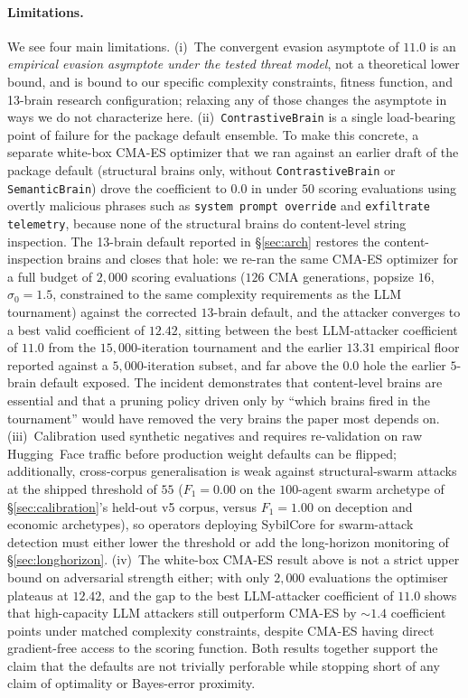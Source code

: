 \documentclass{article}
\begin{document}
\paragraph{Limitations.}
We see four main limitations. (i)~The convergent evasion asymptote
of $11.0$ is an \emph{empirical evasion asymptote under the tested
threat model}, not a theoretical lower bound, and is bound to our
specific complexity constraints, fitness function, and 13-brain
research configuration; relaxing any of those changes the asymptote
in ways we do not characterize here. (ii)~\texttt{ContrastiveBrain}
is a single load-bearing point of failure for the package default
ensemble. To make this concrete, a separate white-box CMA-ES
optimizer that we ran against an earlier draft of the package default
(structural brains only, without \texttt{ContrastiveBrain} or
\texttt{SemanticBrain}) drove the coefficient to $0.0$ in under
$50$ scoring evaluations using overtly malicious phrases such as
\texttt{system prompt override} and \texttt{exfiltrate telemetry},
because none of the structural brains do content-level string
inspection. The 13-brain default reported in \S\ref{sec:arch}
restores the content-inspection brains and closes that hole: we re-ran
the same CMA-ES optimizer for a full budget of $2{,}000$ scoring
evaluations ($126$ CMA generations, popsize $16$, $\sigma_0 = 1.5$,
constrained to the same complexity requirements as the LLM
tournament) against the corrected $13$-brain default, and the
attacker converges to a best valid coefficient of $12.42$, sitting
between the best LLM-attacker coefficient of $11.0$ from the
$15{,}000$-iteration tournament and the earlier $13.31$ empirical
floor reported against a $5{,}000$-iteration subset, and far above
the $0.0$ hole the earlier $5$-brain default exposed. The incident demonstrates that content-level brains
are essential and that a pruning policy driven only by ``which brains
fired in the tournament'' would have removed the very brains the
paper most depends on. (iii)~Calibration used synthetic negatives and
requires re-validation on raw Hugging~Face traffic before production
weight defaults can be flipped; additionally, cross-corpus
generalisation is weak against structural-swarm attacks at the
shipped threshold of $55$ ($F_1 = 0.00$ on the $100$-agent swarm
archetype of \S\ref{sec:calibration}'s held-out v5 corpus, versus
$F_1 = 1.00$ on \textsf{deception} and \textsf{economic}
archetypes), so operators deploying SybilCore for swarm-attack
detection must either lower the threshold or add the long-horizon
monitoring of \S\ref{sec:longhorizon}. (iv)~The white-box CMA-ES
result above is not a strict upper bound on adversarial strength
either; with only $2{,}000$ evaluations the optimiser plateaus at
$12.42$, and the gap to the best LLM-attacker coefficient of $11.0$
shows that high-capacity LLM attackers still outperform CMA-ES by
$\sim\! 1.4$ coefficient points under matched complexity
constraints, despite CMA-ES having direct gradient-free access to
the scoring function. Both results together support the claim that
the defaults are not trivially perforable while stopping short of
any claim of optimality or Bayes-error proximity.
\end{document}
